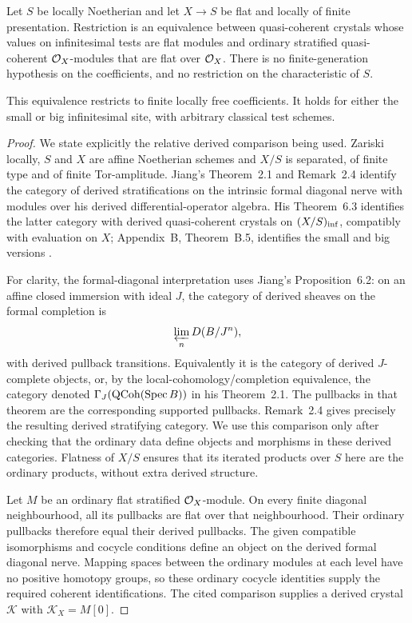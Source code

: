 \begin{proposition}\label{prop:DE-E2-flat-Noetherian}
Let $S$ be locally Noetherian and let $X\to S$ be flat and locally of finite presentation.  Restriction is an equivalence between quasi-coherent crystals whose values on infinitesimal tests are flat modules and ordinary stratified quasi-coherent $\mathcal O_X$-modules that are flat over $\mathcal O_X$.  There is no finite-generation hypothesis on the coefficients, and no restriction on the characteristic of $S$.

This equivalence restricts to finite locally free coefficients.  It holds for either the small or big infinitesimal site, with arbitrary classical test schemes.
\end{proposition}
\begin{proof}
We state explicitly the relative derived comparison being used.  Zariski locally, $S$ and $X$ are affine Noetherian schemes and $X/S$ is separated, of finite type and of finite Tor-amplitude.  Jiang's Theorem~2.1 and Remark~2.4 identify the category of derived stratifications on the intrinsic formal diagonal nerve with modules over his derived differential-operator algebra.  His Theorem~6.3 identifies the latter category with derived quasi-coherent crystals on $(X/S)_{\rm inf}$, compatibly with evaluation on $X$; Appendix~B, Theorem~B.5, identifies the small and big versions \citep[pp.~16--17, 32--34 and 43--45]{Jiang2023Derived}.

For clarity, the formal-diagonal interpretation uses Jiang's Proposition~6.2: on an affine closed immersion with ideal $J$, the category of derived sheaves on the formal completion is
\[
       \varprojlim_n D(B/J^n),
\]
with derived pullback transitions.  Equivalently it is the category of derived $J$-complete objects, or, by the local-cohomology/completion equivalence, the category denoted $\Gamma_J(\mathrm{QCoh}(\operatorname{Spec} B))$ in his Theorem~2.1.  The pullbacks in that theorem are the corresponding supported pullbacks.  Remark~2.4 gives precisely the resulting derived stratifying category.  We use this comparison only after checking that the ordinary data define objects and morphisms in these derived categories.  Flatness of $X/S$ ensures that its iterated products over $S$ here are the ordinary products, without extra derived structure.

Let $M$ be an ordinary flat stratified $\mathcal O_X$-module.  On every finite diagonal neighbourhood, all its pullbacks are flat over that neighbourhood.  Their ordinary pullbacks therefore equal their derived pullbacks.  The given compatible isomorphisms and cocycle conditions define an object on the derived formal diagonal nerve.  Mapping spaces between the ordinary modules at each level have no positive homotopy groups, so these ordinary cocycle identities supply the required coherent identifications.  The cited comparison supplies a derived crystal $\mathcal K$ with $\mathcal K_X=M[0]$.


\end{proof}
